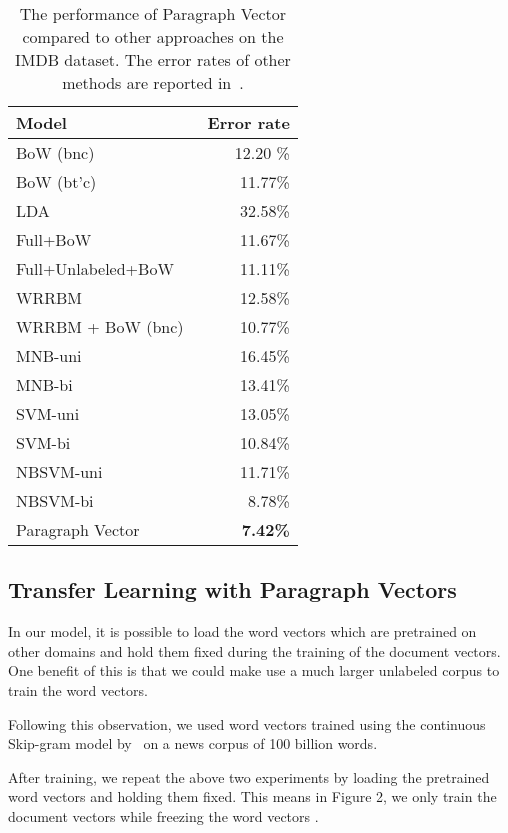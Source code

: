 \documentclass{article}
\begin{document}
\begin{table}[htb]
\caption{The performance of Paragraph Vector compared to other approaches on
  the IMDB dataset. The error rates of other methods are reported
  in~\cite{wang12}.}
\label{tab:imdb}
\begin{center}
\begin{tabular}{|l|r|} 
\hline
Model & Error rate \\ \hline
BoW (bnc)~\cite{maas11} & 12.20 \% \\ 
BoW (bt'c)~\cite{maas11} & 11.77\% \\ 
LDA~\cite{maas11} & 32.58\% \\ 
Full+BoW~\cite{maas11}& 11.67\%\\
Full+Unlabeled+BoW~\cite{maas11}& 11.11\% \\\hline 
WRRBM~\cite{dahl12}& 12.58\%\\
WRRBM + BoW (bnc)~\cite{dahl12}& 10.77\%\\\hline
MNB-uni~\cite{wang12} & 16.45\% \\ 
MNB-bi~\cite{wang12} & 13.41\%\\
SVM-uni~\cite{wang12} & 13.05\%\\
SVM-bi~\cite{wang12} & 10.84\%\\
NBSVM-uni~\cite{wang12} & 11.71\%\\
NBSVM-bi~\cite{wang12} & 8.78\%\\ \hline
Paragraph Vector & {\bf 7.42\%} \\
\hline
\end {tabular}
\end {center}
\end {table}

\iffalse
\subsection{Transfer Learning with Paragraph Vectors}
In our model, it is possible to load the word vectors which are
pretrained on other domains and hold them fixed during the training of
the document vectors. One benefit of this is that we could make use a
much larger unlabeled corpus to train the word vectors.

Following this observation, we used word vectors trained using the
continuous Skip-gram model by~\cite{mikolov} on a news corpus of 100  billion words.

After training, we repeat the above two experiments by loading the
pretrained word vectors and holding them fixed. This means in Figure
2, we only train the document vectors  while freezing the word
vectors .
\end{document}
